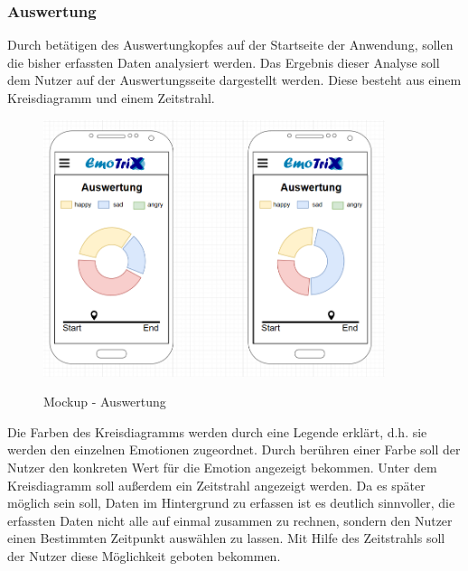 \subsubsection{Auswertung}
Durch betätigen des Auswertungkopfes auf der Startseite der Anwendung, sollen die bisher erfassten Daten analysiert werden. Das Ergebnis dieser Analyse soll dem Nutzer auf der Auswertungsseite dargestellt werden. Diese besteht aus einem Kreisdiagramm und einem Zeitstrahl.
\begin{figure}[h]
	\centering
	\includegraphics[width=10cm]{Bilder/Mockup-Auswertung.png}
	\label{img:Mockup-Auswertung}
	\caption[Mockup - Auswertung]{Mockup - Auswertung}
\end{figure} \newline
Die Farben des Kreisdiagramms werden durch eine Legende erklärt, d.h. sie werden den einzelnen Emotionen zugeordnet. Durch berühren einer Farbe soll der Nutzer den konkreten Wert für die Emotion angezeigt bekommen. Unter dem Kreisdiagramm soll außerdem ein Zeitstrahl angezeigt werden. Da es später möglich sein soll, Daten im Hintergrund zu erfassen ist es deutlich sinnvoller, die erfassten Daten nicht alle auf einmal zusammen zu rechnen, sondern den Nutzer einen Bestimmten Zeitpunkt auswählen zu lassen. Mit Hilfe des Zeitstrahls soll der Nutzer diese Möglichkeit geboten bekommen.